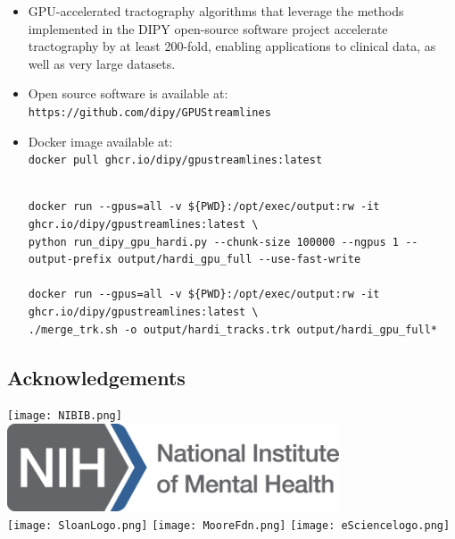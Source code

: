 \documentclass[a0, landscape]{a0poster}
\begin{document}
\begin{multicols}{3}
\begin{itemize}
\item GPU-accelerated tractography algorithms that leverage the methods implemented in the DIPY open-source software project accelerate tractography by at least 200-fold, enabling applications to clinical data, as well as very large datasets.

\item Open source software is available at: \\ \texttt{https://github.com/dipy/GPUStreamlines}

\item Docker image available at: \\ \texttt{docker pull ghcr.io/dipy/gpustreamlines:latest}

\small

\color{blue}
\begin{lstlisting}

docker run --gpus=all -v ${PWD}:/opt/exec/output:rw -it ghcr.io/dipy/gpustreamlines:latest \
python run_dipy_gpu_hardi.py --chunk-size 100000 --ngpus 1 --output-prefix output/hardi_gpu_full --use-fast-write

docker run --gpus=all -v ${PWD}:/opt/exec/output:rw -it ghcr.io/dipy/gpustreamlines:latest \
./merge_trk.sh -o output/hardi_tracks.trk output/hardi_gpu_full*
\end{lstlisting}

\end{itemize}

\color{DarkSlateGray} %



\nocite{*} %
\footnotesize  %

\subsection*{Acknowledgements} \footnotesize


\texttt{[image: NIBIB.png]}
\includegraphics[height=2.6cm]{nimh-logo.png} \\
\texttt{[image: SloanLogo.png]}
\texttt{[image: MooreFdn.png]}
\texttt{[image: eSciencelogo.png]}

\end{multicols}
\end{document}
